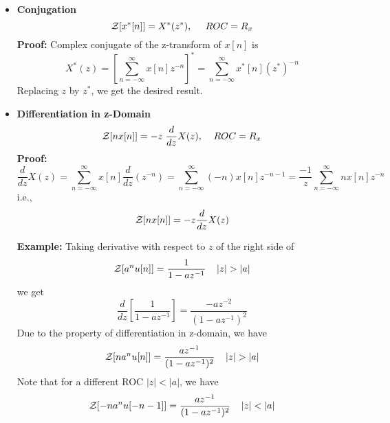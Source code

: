 \begin{itemize}
\item {\bf Conjugation}
\[	{\cal Z}[x^*[n]]=X^*(z^*), \;\;\;\;\;ROC=R_x	\]
{\bf Proof: } Complex conjugate of the z-transform of $x[n]$ is
\[	X^*(z)=[\sum_{n=-\infty}^\infty x[n]z^{-n}]^*
	=\sum_{n=-\infty}^\infty x^*[n](z^*)^{-n}	\]
Replacing $z$ by $z^*$, we get the desired result.

\item {\bf Differentiation in z-Domain}
\[	{\cal Z}[n x[n]]=-z\;\frac{d}{dz}X(z), \;\;\;\; ROC=R_x	\]
{\bf Proof: } 
\[ \frac{d}{dz}X(z)=\sum_{n=-\infty}^\infty x[n] \frac{d}{dz} (z^{-n})
=\sum_{n=-\infty}^\infty (-n) x[n] z^{-n-1}
=\frac{-1}{z}\sum_{n=-\infty}^\infty n x[n] z^{-n} \]
i.e.,
\[	{\cal Z}[n x[n]]=-z\frac{d}{dz}X(z)	\]

{\bf Example: } Taking derivative with respect to $z$ of the right side of
\[	{\cal Z}[a^nu[n]]=\frac{1}{1-az^{-1}}\;\;\;\;|z|>|a|	\]
we get
\[	\frac{d}{dz}\left[ \frac{1}{1-az^{-1}}\right]=\frac{-az^{-2}}{(1-az^{-1})^2}	\]
Due to the  property of differentiation in z-domain, we have
\[	{\cal Z}[n a^n u[n]]=\frac{az^{-1}}{(1-az^{-1})^2}\;\;\;\;|z|>|a|	\]
Note that for a different ROC $|z|<|a|$, we have
\[	{\cal Z}[-n a^n u[-n-1]]=\frac{az^{-1}}{(1-az^{-1})^2}\;\;\;\;|z|<|a|	\]

\end{itemize}

\newpage
